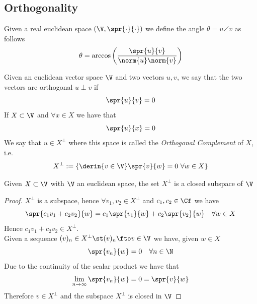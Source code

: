 \documentclass[../mmf.tex]{subfiles}
\begin{document}
\subsection{Orthogonality}
\begin{dfn}[Angle]
	Given a real euclidean space $(\V,\spr{\cdot}{\cdot})$ we define the angle $\theta=u\angle v$ as follows
	\begin{equation}
		\theta=\arccos\left( \frac{\spr{u}{v}}{\norm{u}\norm{v}} \right)
		\label{eq:anglebwvec}
	\end{equation}
\end{dfn}
\begin{dfn}
	Given an euclidean vector space $\V$ and two vectors $u,v$, we say that the two vectors are orthogonal $u\perp v$ if
	\begin{equation}
		\spr{u}{v}=0
		\label{eq:orthvec}
	\end{equation}
	If $X\subset\V$ and $\forall x\in X$ we have that
	\begin{equation*}
		\spr{u}{x}=0
	\end{equation*}
	We say that $u\in X^{\perp}$ where this space is called the \textit{Orthogonal Complement} of $X$, i.e.
	\begin{equation}
		X^\perp:=\left\{ \derin{v\in\V}\spr{v}{w}=0\ \forall w\in X \right\}
		\label{eq:xbot}
	\end{equation}
\end{dfn}
\begin{thm}
	Given $X\subset\V$ with $\V$ an euclidean space, the set $X^\perp$ is a closed subspace of $\V$
\end{thm}
\begin{proof}
	$X^\perp$ is a subspace, hence $\forall v_1,v_2\in X^\perp$ and $c_1,c_2\in\Cf$ we have
	\begin{equation*}
		\spr{c_1v_1+c_2v_2}{w}=c_1\spr{v_1}{w}+c_2\spr{v_2}{w}\quad\forall w\in X
	\end{equation*}
	Hence $c_1v_1+c_2v_2\in X^\perp$.\\
	Given a sequence $(v)_n\in X^{\perp}\st(v)_n\fto v\in\V$ we have, given $w\in X$
	\begin{equation*}
		\spr{v_n}{w}=0\quad\forall n\in\N
	\end{equation*}
	Due to the continuity of the scalar product we have that
	\begin{equation*}
		\lim_{n\to\infty}\spr{v_n}{w}=0=\spr{v}{w}
	\end{equation*}
	Therefore $v\in X^\perp$ and the subspace $X^\perp$ is closed in $\V$
\end{proof}
\end{document}
